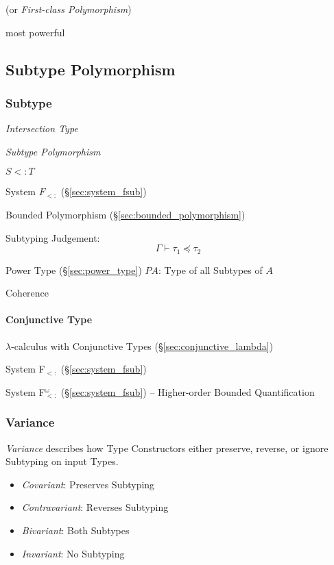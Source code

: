 (or \emph{First-class Polymorphism})

most powerful



\subsection{Subtype Polymorphism}\label{sec:subtype_polymorphism}

\subsubsection{Subtype}\label{sec:subtype}

\emph{Intersection Type}

\emph{Subtype Polymorphism}

$S <: T$

System $F_{<:}$ (\S\ref{sec:system_fsub})

Bounded Polymorphism (\S\ref{sec:bounded_polymorphism})

Subtyping Judgement:
\[
  \Gamma \vdash \tau_1 \preceq \tau_2
\]

Power Type (\S\ref{sec:power_type}) $P A$: Type of all Subtypes of $A$

Coherence



\paragraph{Conjunctive Type}\label{sec:conjunctive_type}\hfill

$\lambda$-calculus with Conjunctive Types
(\S\ref{sec:conjunctive_lambda})

System F$_{<:}$ (\S\ref{sec:system_fsub})

System F$_{<:}^\omega$ (\S\ref{sec:system_fsub}) -- Higher-order
Bounded Quantification



\subsubsection{Variance}\label{sec:type_variance}

\emph{Variance} describes how Type Constructors either preserve,
reverse, or ignore Subtyping on input Types.

\begin{itemize}
  \item \emph{Covariant}: Preserves Subtyping
  \item \emph{Contravariant}: Reverses Subtyping
  \item \emph{Bivariant}: Both Subtypes
  \item \emph{Invariant}: No Subtyping
\end{itemize}

